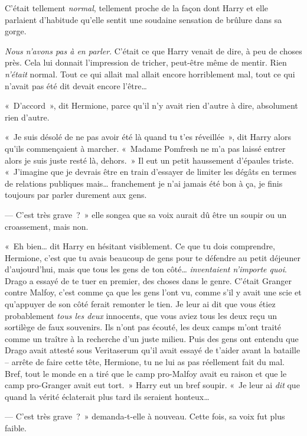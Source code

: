 C'était tellement \emph{normal}, tellement proche de la façon dont Harry et elle parlaient d'habitude qu'elle sentit une soudaine sensation de brûlure dans sa gorge.

\emph{Nous n'avons pas à en parler}.
C'était ce que Harry venait de dire, à peu de choses près.
Cela lui donnait l'impression de tricher, peut-être même de mentir.
Rien \emph{n'était} normal.
Tout ce qui allait mal allait encore horriblement mal, tout ce qui n'avait pas été dit devait encore l'être…

«~D'accord~», dit Hermione, parce qu'il n'y avait rien d'autre à dire, absolument rien d'autre.

«~Je suis désolé de ne pas avoir été là quand tu t'es réveillée~», dit Harry alors qu'ils commençaient à marcher.
«~Madame Pomfresh ne m'a pas laissé entrer alors je suis juste resté là, dehors.~»
Il eut un petit haussement d'épaules triste.
«~J'imagine que je devrais être en train d'essayer de limiter les dégâts en termes de relations publiques mais… franchement je n'ai jamais été bon à ça, je finis toujours par parler durement aux gens.

--- C'est très grave~?~»
elle songea que sa voix aurait dû être un soupir ou un croassement, mais non.

«~Eh bien… dit Harry en hésitant visiblement.
Ce que tu dois comprendre, Hermione, c'est que tu avais beaucoup de gens pour te défendre au petit déjeuner d'aujourd'hui, mais que tous les gens de ton côté…
\emph{inventaient n'importe quoi}.
Drago a essayé de te tuer en premier, des choses dans le genre.
C'était Granger contre Malfoy, c'est comme ça que les gens l'ont vu, comme s'il y avait une scie et qu'appuyer de son côté ferait remonter le tien.
Je leur ai dit que vous étiez probablement \emph{tous les deux} innocents, que vous aviez tous les deux reçu un sortilège de faux souvenirs.
Ils n'ont pas écouté, les deux camps m'ont traité comme un traître à la recherche d'un juste milieu.
Puis des gens ont entendu que Drago avait attesté sous Veritaserum qu'il avait essayé de t'aider avant la bataille -- arrête de faire cette tête, Hermione, tu ne lui as pas réellement fait du mal.
Bref, tout le monde en a tiré que le camp pro-Malfoy avait eu raison et que le camp pro-Granger avait eut tort.~»
Harry eut un bref soupir.
«~Je leur ai \emph{dit} que quand la vérité éclaterait plus tard ils seraient honteux…

--- C'est très grave~?~»
demanda-t-elle à nouveau.
Cette fois, sa voix fut plus faible.

